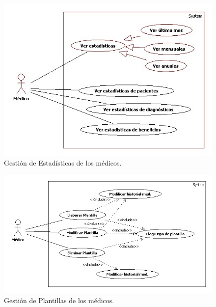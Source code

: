 					\begin{figure}[H]
					  \centering
					    \includegraphics[width=12cm]{img/jpg/casos_uso/Estadisticas.jpg}
					  \caption{Gestión de Estadísticas de los médicos.}
					  \label{fig:estad_med}
					\end{figure}

					\begin{figure}[H]
					  \centering
					    \includegraphics[width=14cm]{img/jpg/casos_uso/Gestion_plantillas.jpg}
					  \caption{Gestión de Plantillas de los médicos.}
					  \label{fig:plan_med}
					\end{figure}

